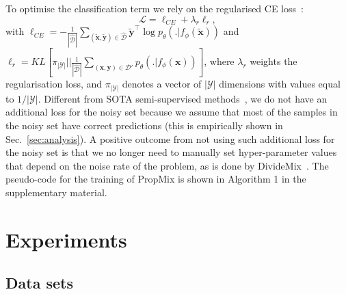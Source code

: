 \documentclass{bmvc2k}
\begin{document}
To optimise the classification term we rely on the regularised CE loss~\citep{DivideMix}:
\begin{equation}
    \mathcal{L}= \ell_{CE}  +\lambda_r\ell_{r},
    \label{eq:max_likelihood_loss}
\end{equation}
with $\ell_{CE} = -\frac{1}{|\mathcal{\hat{D}}|}\sum_{(\tilde{\mathbf{x}},\tilde{\mathbf{y}})\in\mathcal{\hat{D}}} \tilde{\mathbf{y}}^{\top}\log p_{\theta}(. | f_{\phi}(\tilde{\mathbf{x}}))$ 
 and 
$ \ell_r = KL \left [ \pi_{|\mathcal{Y}|} \Bigg | \Bigg | \frac{1}{|\mathcal{\hat{D}}| } \sum_{ (\mathbf{x},\mathbf{y}) \in \mathcal{D}'} p_{\theta}(.|f_{\phi}(\mathbf{x})) \right ]$,  
where $\lambda_{r}$ weights the regularisation loss, and $\pi_{|\mathcal{Y}|}$ denotes a vector of $|\mathcal{Y}|$ dimensions with values equal to $1/|\mathcal{Y}|$. 
Different from SOTA semi-supervised methods~\citep{DivideMix,AugDesc}, we do not have an additional loss for the noisy set because we assume that most of the samples in the noisy set have correct predictions (this is empirically shown in Sec.~\ref{sec:analysis}). 
A positive outcome from not using such additional loss for the noisy set is that we no longer need to manually set hyper-parameter values that depend on the noise rate of the problem, as is done by DivideMix~\citep{DivideMix}.
The pseudo-code for the training of PropMix is shown in Algorithm 1 in the supplementary material.  
















 
 






                
                
                




        
        




\vspace{-.1in}
\section{Experiments}

\subsection{Data sets}
\end{document}
